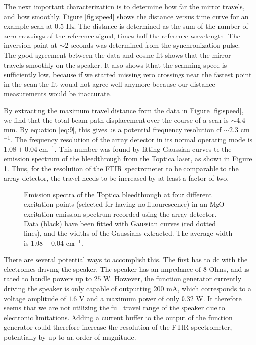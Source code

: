 \documentclass[12pt]{report}
\newcommand{\wn}[1][ ]{cm$^{-1}$#1}
\begin{document}
The next important characterization is to determine how far the mirror travels, and how smoothly. Figure \ref{fig:speed} shows the distance versus time curve for an example scan at 0.5 Hz. The distance is determined as the sum of the number of zero crossings of the reference signal, times half the reference wavelength. The inversion point at $\sim 2$ seconds was determined from the synchronization pulse. The good agreement between the data and cosine fit shows that the mirror travels smoothly on the speaker. It also shows tthat the scanning speed is sufficiently low, because if we started missing zero crossings near the fastest point in the scan the fit would not agree well anymore because our distance measurements would be inaccurate.

By extracting the maximum travel distance from the data in Figure \ref{fig:speed}, we find that the total beam path displacement over the course of a scan is $\sim 4.4$ mm. By equation \eqref{eq:9}, this gives us a potential frequency resolution of $\sim 2.3$ \wn[]. The frequency resolution of the array detector in its normal operating mode is $1.08 \pm 0.04$ \wn[]. This number was found by fitting Gaussian curves to the emission spectrum of the bleedthrough from the Toptica laser, as shown in Figure \ref{fig:emresolution}. Thus, for the resolution of the FTIR spectrometer to be comparable to the array detector, the travel needs to be increased by at least a factor of two.

\begin{figure}[t]
  \centering
  \iftoggle{imgs}{
    \texttt{[image: EmissionResolution]}
  }{}
  \caption{Emission spectra of the Toptica bleedthrough at four different excitation points (selected for having no fluourescence) in an MgO excitation-emission spectrum recorded using the array detector. Data (black) have been fitted with Gaussian curves (red dotted lines), and the widths of the Gaussians extracted. The average width is $1.08\pm 0.04$ \wn[.]}
  \label{fig:emresolution}
\end{figure}

There are several potential ways to accomplish this. The first has to do with the electronics driving the speaker. The speaker has an impedance of 8 Ohms, and is rated to handle powers up to $25$ W. However, the function generator currently driving the speaker is only capable of outputting 200 mA, which corresponds to a voltage amplitude of $1.6$ V and a maximum power of only $0.32$ W. It therefore seems that we are not utilizing the full travel range of the speaker due to electronic limitations. Adding a current buffer to the output of the function generator could therefore increase the resolution of the FTIR spectrometer, potentially by up to an order of magnitude.
\end{document}
